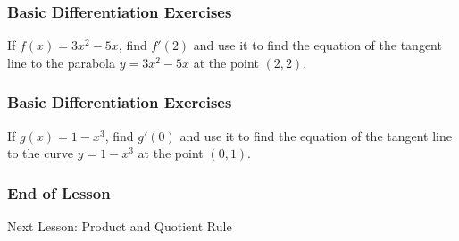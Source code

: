 \documentclass[xcolor=dvipsnames]{beamer}
\begin{document}
\begin{frame}
  \frametitle{Basic Differentiation Exercises}
  {\ubung} If $f(x)=3x^{2}-5x$, find $f'(2)$ and use it to find the
  equation of the tangent line to the parabola $y=3x^{2}-5x$ at the
  point $(2,2)$.
\end{frame}

\begin{frame}
  \frametitle{Basic Differentiation Exercises}
  {\ubung} If $g(x)=1-x^{3}$, find $g'(0)$ and use it to find the
  equation of the tangent line to the curve $y=1-x^{3}$ at the point
  $(0,1)$.
\end{frame}

\begin{frame}
  \frametitle{End of Lesson}
Next Lesson: Product and Quotient Rule
\end{frame}
\end{document}
